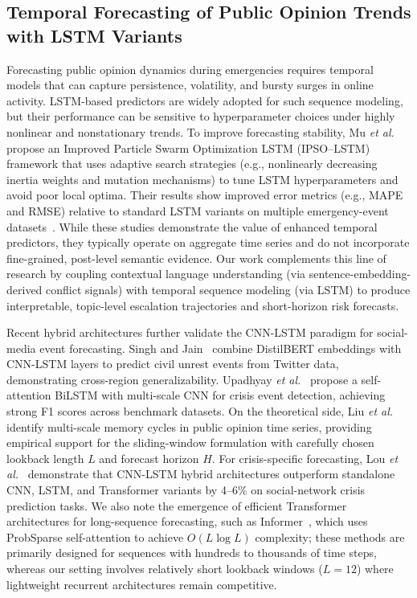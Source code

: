 \documentclass[journal]{IEEEtran}
\begin{document}
\subsection{Temporal Forecasting of Public Opinion Trends with LSTM Variants}
Forecasting public opinion dynamics during emergencies requires temporal models that can capture persistence, volatility, and bursty surges in online activity. LSTM-based predictors are widely adopted for such sequence modeling, but their performance can be sensitive to hyperparameter choices under highly nonlinear and nonstationary trends. To improve forecasting stability, Mu \emph{et al.}~\cite{Mu2023IPSO} propose an Improved Particle Swarm Optimization LSTM (IPSO--LSTM) framework that uses adaptive search strategies (e.g., nonlinearly decreasing inertia weights and mutation mechanisms) to tune LSTM hyperparameters and avoid poor local optima. Their results show improved error metrics (e.g., MAPE and RMSE) relative to standard LSTM variants on multiple emergency-event datasets~\cite{Mu2023IPSO}. While these studies demonstrate the value of enhanced temporal predictors, they typically operate on aggregate time series and do not incorporate fine-grained, post-level semantic evidence. Our work complements this line of research by coupling contextual language understanding (via sentence-embedding-derived conflict signals) with temporal sequence modeling (via LSTM) to produce interpretable, topic-level escalation trajectories and short-horizon risk forecasts.

Recent hybrid architectures further validate the CNN-LSTM paradigm for social-media event forecasting. Singh and Jain~\cite{singh2025cupcdlstm} combine DistilBERT embeddings with CNN-LSTM layers to predict civil unrest events from Twitter data, demonstrating cross-region generalizability. Upadhyay \emph{et al.}~\cite{upadhyay2024satcobilstm} propose a self-attention BiLSTM with multi-scale CNN for crisis event detection, achieving strong F1 scores across benchmark datasets. On the theoretical side, Liu \emph{et al.}~\cite{liu2025memory} identify multi-scale memory cycles in public opinion time series, providing empirical support for the sliding-window formulation with carefully chosen lookback length $L$ and forecast horizon $H$. For crisis-specific forecasting, Lou \emph{et al.}~\cite{lou2024cnnlstm} demonstrate that CNN-LSTM hybrid architectures outperform standalone CNN, LSTM, and Transformer variants by 4--6\% on social-network crisis prediction tasks. We also note the emergence of efficient Transformer architectures for long-sequence forecasting, such as Informer~\cite{zhou2021informer}, which uses ProbSparse self-attention to achieve $O(L\log L)$ complexity; these methods are primarily designed for sequences with hundreds to thousands of time steps, whereas our setting involves relatively short lookback windows ($L{=}12$) where lightweight recurrent architectures remain competitive.
\end{document}
